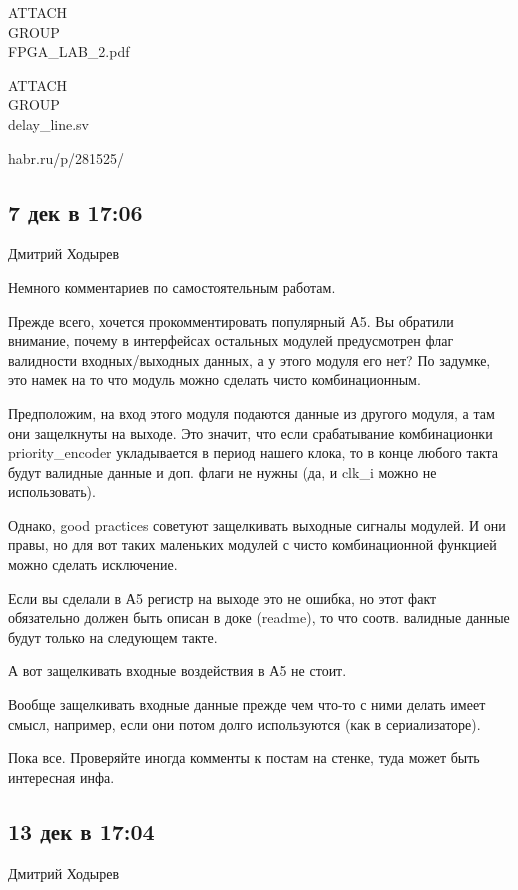 \documentclass[a4paper, 12pt]{extarticle}
\begin{document}
ATTACH\\GROUP\\FPGA_LAB_2.pdf

ATTACH\\GROUP\\delay_line.sv



habr.ru/p/281525/



\subsection{7 дек в 17:06}

Дмитрий Ходырев

Немного комментариев по самостоятельным работам.

Прежде всего, хочется прокомментировать популярный А5. Вы обратили внимание, почему в интерфейсах остальных модулей предусмотрен флаг валидности входных/выходных данных, а у этого модуля его нет? По задумке, это намек на то что модуль можно сделать чисто комбинационным.

Предположим, на вход этого модуля подаются данные из другого модуля, а там они защелкнуты на выходе. Это значит, что если срабатывание комбинационки priority_encoder укладывается в период нашего клока, то в конце любого такта будут валидные данные и доп. флаги не нужны (да, и clk_i можно не использовать).

Однако, good practices советуют защелкивать выходные сигналы модулей. И они правы, но для вот таких маленьких модулей с чисто комбинационной функцией можно сделать исключение.

Если вы сделали в А5 регистр на выходе это не ошибка, но этот факт обязательно должен быть описан в доке (readme), то что соотв. валидные данные будут только на следующем такте.

А вот защелкивать входные воздействия в А5 не стоит.

Вообще защелкивать входные данные прежде чем что-то с ними делать имеет смысл, например, если они потом долго используются (как в сериализаторе).

Пока все. Проверяйте иногда комменты к постам на стенке, туда может быть интересная инфа.

\subsection{13 дек в 17:04}

Дмитрий Ходырев
\end{document}

